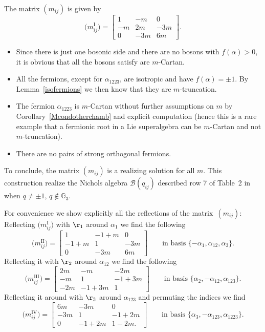 \documentclass[pdftex]{sigma}%
\numberwithin{equation}{section}
\begin{document}
The matrix $(m_{ij})$ is given by
\[
\big(m_{ij}^\mathrm{I}\big)= \begin{bmatrix}
1 & -m & 0\\
 -m & 2m & -3m\\
0 & -3m & 6m
\end{bmatrix}.
\]
\begin{itemize}\itemsep=0pt
	\item Since there is just one bosonic side and there are no bosons with $f(\alpha)>0$, it is obvious that all the bosons satisfy are $m$-Cartan.
	\item All the fermions, except for $\alpha_{1223}$, are isotropic and have $f(\alpha)= \pm 1$. By Lemma~\ref{isofermions} we then know that they are $m$-truncation.
	\item The fermion $\alpha_{1223}$ is $m$-Cartan without further assumptions on $m$ by Corollary~\ref{Mcondotherchamb} and explicit computation
	(hence this is a rare example that a fermionic root in a Lie superalgebra can be $m$-Cartan and not $m$-truncation).
	\item There are no pairs of strong orthogonal fermions.
\end{itemize}
To conclude, the matrix $(m_{ij})$ is a realizing solution for all $m$.
This construction realize the Nichols algebra $\mathcal{B}(q_{ij})$ described row 7 of Table~2 in~\cite{Hecklist} when $q\neq \pm 1$, $q\not\in\mathbb{G}_3$.

For convenience we show explicitly all the reflections of the matrix~$(m_{ij})$:
Reflecting $\big(m_{ij}^\mathrm{I}\big)$ with $\r_1$ around $\alpha_1$ we find the following
\[
\big(m_{ij}^\mathrm{II}\big)= \begin{bmatrix}
 1 & -1+m & 0\\
 -1+m &  1 & -3m \\
 0 & -3m & 6m
\end{bmatrix}
\qquad \text{in basis } \{-\alpha_1,\alpha_{12},\alpha_3\}.
\]
Reflecting it with $\r_2$ around $\alpha_{12}$ we find the following
\[
\big(m_{ij}^\mathrm{III}\big)= \begin{bmatrix}
 2m & -m & -2m\\
 -m &  1 & -1+3m \\
 -2m & -1+3m & 1
\end{bmatrix}\qquad
\text{in basis } \{\alpha_2,-\alpha_{12},\alpha_{123}\}.
\]
Reflecting it around with $\r_3$ around $\alpha_{123}$ and permuting the indices we find
\[
\big(m_{ij}^\mathrm{IV}\big)= \begin{bmatrix}
6m & -3m & 0\\
-3m &  1 & -1+2m \\
0 & -1+2m & 1-2m.
\end{bmatrix}\qquad
\text{in basis } \{\alpha_{3},-\alpha_{123},\alpha_{1223}\}.
\]
\end{document}

